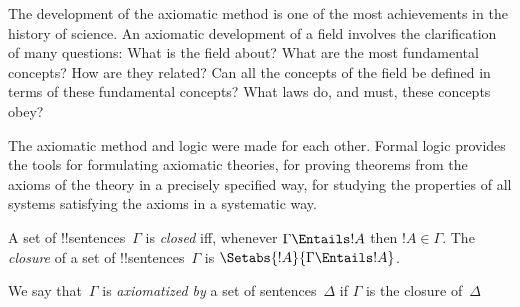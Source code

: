 \documentclass[../../include/open-logic-section]{subfiles}
\begin{document}


\begin{explain}
The development of the axiomatic method is one of the most
achievements in the history of science.  An axiomatic development of a
field involves the clarification of many questions: What is the field
about? What are the most fundamental concepts?  How are they related?
Can all the concepts of the field be defined in terms of these
fundamental concepts?  What laws do, and must, these concepts obey?

The axiomatic method and logic were made for each other.  Formal logic
provides the tools for formulating axiomatic theories, for proving
theorems from the axioms of the theory in a precisely specified way,
for studying the properties of all systems satisfying the axioms in a
systematic way.
\end{explain}

\begin{defn}
A set of !!{sentence}s~$\Gamma$ is \emph{closed} iff, whenever
$\Gamma \Entails !A$ then $!A \in \Gamma$.  The \emph{closure} of a set
of !!{sentence}s~$\Gamma$ is $\Setabs{!A}{\Gamma \Entails !A}$.

We say that~$\Gamma$ is \emph{axiomatized by} a set of
sentences~$\Delta$ if $\Gamma$ is the closure of~$\Delta$
\end{defn}
\end{document}
